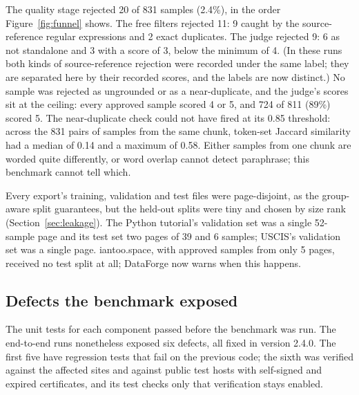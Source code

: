 \documentclass[11pt]{article}
\begin{document}
The quality stage rejected 20 of 831 samples (2.4\%), in the order
Figure~\ref{fig:funnel} shows. The free filters
rejected 11: 9 caught by the source-reference regular expressions and 2
exact duplicates. The judge rejected 9: 6 as not standalone and 3 with a
score of 3, below the minimum of 4. (In these runs both kinds of
source-reference rejection were recorded under the same label; they are
separated here by their recorded scores, and the labels are now
distinct.) No sample was rejected as ungrounded or as a near-duplicate,
and the judge's scores sit at the ceiling: every approved sample scored 4
or 5, and 724 of 811 (89\%) scored 5. The near-duplicate check could not
have fired at its 0.85 threshold: across the 831 pairs of samples from the
same chunk, token-set Jaccard similarity had a median of 0.14 and a
maximum of 0.58. Either samples from one chunk are worded quite
differently, or word overlap cannot detect paraphrase; this benchmark
cannot tell which.

Every export's training, validation and test files were page-disjoint, as
the group-aware split guarantees, but the held-out splits were tiny and
chosen by size rank (Section~\ref{sec:leakage}). The Python tutorial's
validation set was a single 52-sample page and its test set two pages of
39 and 6 samples; USCIS's validation set was a single page. iantoo.space,
with approved samples from only 5 pages, received no test split at all;
DataForge now warns when this happens.

\subsection{Defects the benchmark exposed}
\label{sec:eval-defects}
The unit tests for each component passed before the benchmark was run.
The end-to-end runs nonetheless exposed six defects, all fixed in version
2.4.0. The first five have regression tests that fail on the previous
code; the sixth was verified against the affected sites and against
public test hosts with self-signed and expired certificates, and its test
checks only that verification stays enabled.
\end{document}
